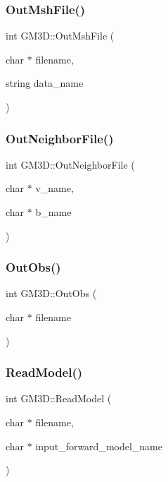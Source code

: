 \mbox{\label{class_g_m3_d_a052c44e6d3db5ca4bd2b644ca95bb3b4}} 
\subsubsection{\texorpdfstring{OutMshFile()}{OutMshFile()}}
{\footnotesize\ttfamily int G\+M3\+D\+::\+Out\+Msh\+File (\begin{DoxyParamCaption}\item[{char $\ast$}]{filename,  }\item[{string}]{data\+\_\+name }\end{DoxyParamCaption})}

\mbox{\label{class_g_m3_d_ab209045f308eb02fe251f1817a6e1487}} 
\subsubsection{\texorpdfstring{OutNeighborFile()}{OutNeighborFile()}}
{\footnotesize\ttfamily int G\+M3\+D\+::\+Out\+Neighbor\+File (\begin{DoxyParamCaption}\item[{char $\ast$}]{v\+\_\+name,  }\item[{char $\ast$}]{b\+\_\+name }\end{DoxyParamCaption})}

\mbox{\label{class_g_m3_d_a4921121bd02215651d1b103c6f7ce8aa}} 
\subsubsection{\texorpdfstring{OutObs()}{OutObs()}}
{\footnotesize\ttfamily int G\+M3\+D\+::\+Out\+Obs (\begin{DoxyParamCaption}\item[{char $\ast$}]{filename }\end{DoxyParamCaption})}

\mbox{\label{class_g_m3_d_ac4ae7d42841c34329b0f6759d7b25ed3}} 
\subsubsection{\texorpdfstring{ReadModel()}{ReadModel()}}
{\footnotesize\ttfamily int G\+M3\+D\+::\+Read\+Model (\begin{DoxyParamCaption}\item[{char $\ast$}]{filename,  }\item[{char $\ast$}]{input\+\_\+forward\+\_\+model\+\_\+name }\end{DoxyParamCaption})}

